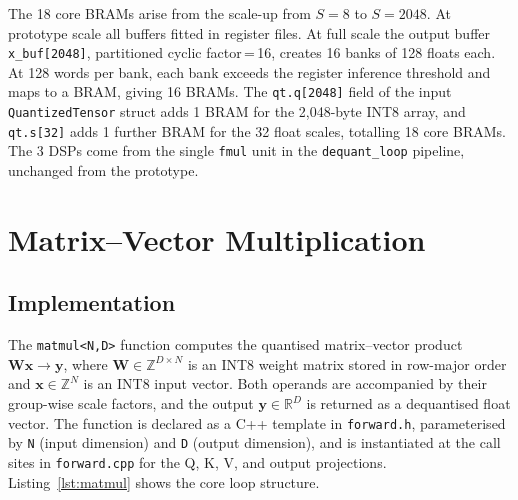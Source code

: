 The 18 core BRAMs arise from the scale-up from $S = 8$ to $S = 2048$.
At prototype scale all buffers fitted in register files. At full scale
the output buffer \texttt{x\_buf[2048]}, partitioned cyclic
factor\,=\,16, creates 16 banks of 128 floats each. At 128 words per
bank, each bank exceeds the register inference threshold and maps to a
BRAM, giving 16 BRAMs. The \texttt{qt.q[2048]} field of the input
\texttt{QuantizedTensor} struct adds 1 BRAM for the 2{,}048-byte INT8
array, and \texttt{qt.s[32]} adds 1 further BRAM for the 32 float
scales, totalling 18 core BRAMs. The 3 DSPs come from the single
\texttt{fmul} unit in the \texttt{dequant\_loop} pipeline, unchanged
from the prototype.



\section{Matrix--Vector Multiplication}
\label{sec:matmul_impl}

\subsection{Implementation}
\label{subsec:matmul_impl}

The \texttt{matmul<N,D>} function computes the quantised matrix--vector
product $\mathbf{W}\mathbf{x} \to \mathbf{y}$, where $\mathbf{W} \in
\mathbb{Z}^{D \times N}$ is an INT8 weight matrix stored in row-major
order and $\mathbf{x} \in \mathbb{Z}^N$ is an INT8 input vector. Both
operands are accompanied by their group-wise scale factors, and the output
$\mathbf{y} \in \mathbb{R}^D$ is returned as a dequantised float vector.
The function is declared as a C++ template in \texttt{forward.h},
parameterised by \texttt{N} (input dimension) and \texttt{D} (output
dimension), and is instantiated at the call sites in \texttt{forward.cpp}
for the Q, K, V, and output projections. Listing~\ref{lst:matmul} shows
the core loop structure.

